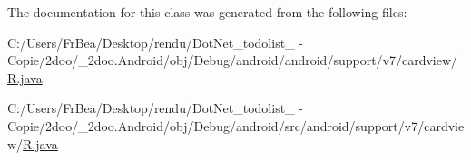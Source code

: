 The documentation for this class was generated from the following files:\begin{CompactItemize}
\item 
C:/Users/FrBea/Desktop/rendu/DotNet\_\-todolist\_ - Copie/2doo/\_\-2doo.Android/obj/Debug/android/android/support/v7/cardview/\hyperlink{android_2support_2v7_2cardview_2_r_8java}{R.java}\item 
C:/Users/FrBea/Desktop/rendu/DotNet\_\-todolist\_ - Copie/2doo/\_\-2doo.Android/obj/Debug/android/src/android/support/v7/cardview/\hyperlink{src_2android_2support_2v7_2cardview_2_r_8java}{R.java}\end{CompactItemize}
